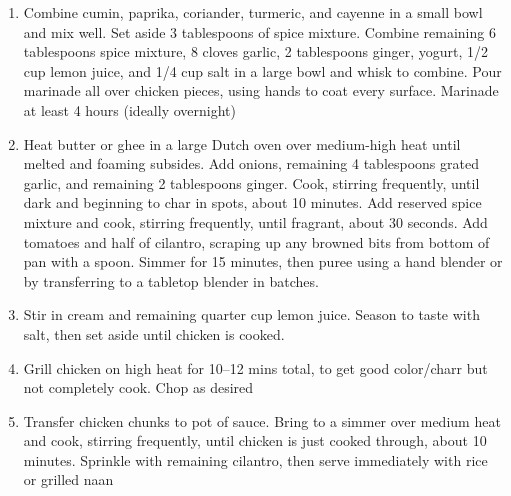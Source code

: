 \documentclass[]{report}
\begin{document}
            {\begin{enumerate}    %
                  \item  Combine cumin, paprika, coriander, turmeric, and cayenne in a small bowl and mix well. Set aside 3 tablespoons of spice mixture. Combine remaining 6 tablespoons spice mixture, 8 cloves garlic, 2 tablespoons ginger, yogurt, 1/2 cup lemon juice, and 1/4 cup salt in a large bowl and whisk to combine. Pour marinade all over chicken pieces, using hands to coat every surface. Marinade at least 4 hours (ideally overnight)
                  \item Heat butter or ghee in a large Dutch oven over medium-high heat until melted and foaming subsides. Add onions, remaining 4 tablespoons grated garlic, and remaining 2 tablespoons ginger. Cook, stirring frequently, until dark and beginning to char in spots, about 10 minutes. Add reserved spice mixture and cook, stirring frequently, until fragrant, about 30 seconds. Add tomatoes and half of cilantro, scraping up any browned bits from bottom of pan with a spoon. Simmer for 15 minutes, then puree using a hand blender or by transferring to a tabletop blender in batches.
                  \item Stir in cream and remaining quarter cup lemon juice. Season to taste with salt, then set aside until chicken is cooked.
                  \item Grill chicken on high heat for 10--12 mins total, to get good color/charr but not completely cook. Chop as desired
                  \item Transfer chicken chunks to pot of sauce. Bring to a simmer over medium heat and cook, stirring frequently, until chicken is just cooked through, about 10 minutes. Sprinkle with remaining cilantro, then serve immediately with rice or grilled naan 
            \end{enumerate}}
\end{document}
